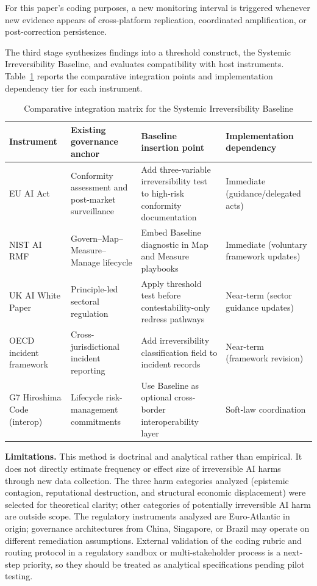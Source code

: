\documentclass[11pt]{article}
\begin{document}
For this paper's coding purposes, a new monitoring interval is triggered whenever new evidence appears of cross-platform replication, coordinated amplification, or post-correction persistence.

The third stage synthesizes findings into a threshold construct, the Systemic Irreversibility Baseline, and evaluates compatibility with host instruments. Table~\ref{tab:integration-matrix} reports the comparative integration points and implementation dependency tier for each instrument.

\begin{table}[H]
  \centering
  \small
  \caption{Comparative integration matrix for the Systemic Irreversibility Baseline}
  \label{tab:integration-matrix}
  \begin{tabular}{p{2.6cm}p{3.3cm}p{3.6cm}p{3.6cm}}
    \toprule
    Instrument & Existing governance anchor & Baseline insertion point & Implementation dependency \\
    \midrule
    EU AI Act & Conformity assessment and post-market surveillance & Add three-variable irreversibility test to high-risk conformity documentation & Immediate (guidance/delegated acts) \\
    NIST AI RMF & Govern--Map--Measure--Manage lifecycle & Embed Baseline diagnostic in Map and Measure playbooks & Immediate (voluntary framework updates) \\
    UK AI White Paper & Principle-led sectoral regulation & Apply threshold test before contestability-only redress pathways & Near-term (sector guidance updates) \\
    OECD incident framework & Cross-jurisdictional incident reporting & Add irreversibility classification field to incident records & Near-term (framework revision) \\
    G7 Hiroshima Code (interop) & Lifecycle risk-management commitments & Use Baseline as optional cross-border interoperability layer & Soft-law coordination \\
    \bottomrule
  \end{tabular}
\end{table}

\textbf{Limitations.} This method is doctrinal and analytical rather than empirical. It does not directly estimate frequency or effect size of irreversible AI harms through new data collection. The three harm categories analyzed (epistemic contagion, reputational destruction, and structural economic displacement) were selected for theoretical clarity; other categories of potentially irreversible AI harm are outside scope. The regulatory instruments analyzed are Euro-Atlantic in origin; governance architectures from China, Singapore, or Brazil may operate on different remediation assumptions. External validation of the coding rubric and routing protocol in a regulatory sandbox or multi-stakeholder process is a next-step priority, so they should be treated as analytical specifications pending pilot testing.
\end{document}
